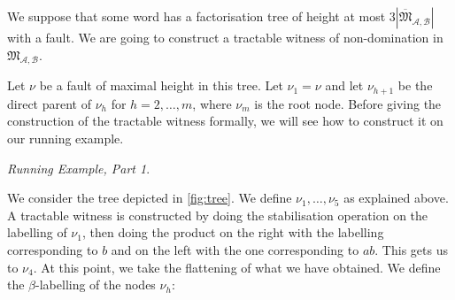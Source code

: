 \documentclass{lmcs}
\theoremstyle{remark}
\newcommand{\ideal}{\mathfrak{M}}
\newcommand{\autA}{\mathcal{A}}
\newcommand{\autB}{\mathcal{B}}
\theoremstyle{remark}
\newtheorem{runningexample/}{Running Example, Part}
\newenvironment{runningexample}
  {\renewcommand{\qedsymbol}{\color{darkgray}\ensuremath{\lrcorner}}%
   \pushQED{\qed}\begin{runningexample/}}
  {\popQED\end{runningexample/}}
\begin{document}
We suppose that some word has a factorisation tree of height at most $3|\overline{\ideal}_{\autA,\autB}|$ with a fault. We are going to construct a tractable witness of non-domination in $\ideal_{\autA,\autB}$.

Let $\nu$ be a fault of maximal height in this tree. Let $\nu_1 = \nu$ and let $\nu_{h+1}$ be the direct parent of $\nu_h$ for $h=2,\dots,m$, where $\nu_m$ is the root node. Before giving the construction of the tractable witness formally, we will see how to construct it on our running example.

\begin{runningexample}\label{runningeg:constructingawitnessfromfault}

We consider the tree depicted in \cref{fig:tree}. We define $\nu_1, \ldots, \nu_5$ as explained above. A tractable witness is constructed by doing the stabilisation operation on the labelling of $\nu_1$, then doing the product on the right with the labelling corresponding to $b$ and on the left with the one corresponding to $ab$. This gets us to $\nu_4$. At this point, we take the flattening of what we have obtained. We define the $\beta$-labelling of the nodes $\nu_h$:


\end{runningexample}
\end{document}
